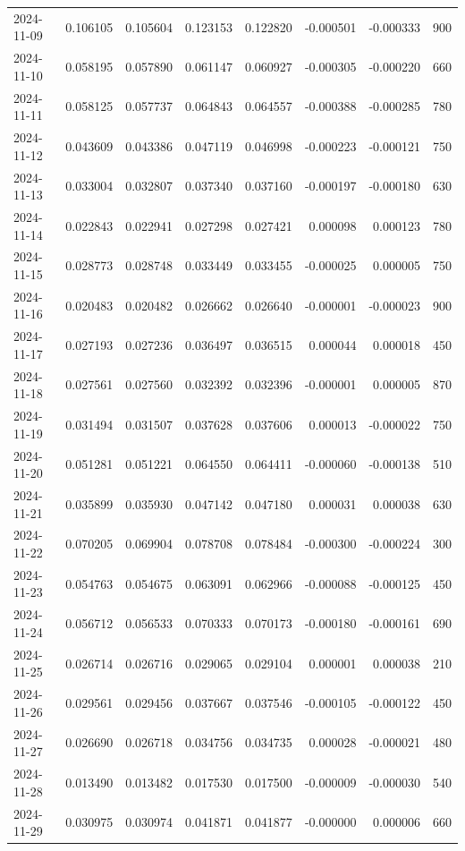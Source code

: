\begin{tabular}{lrrrrrrr}
2024-11-09 & 0.106105 & 0.105604 & 0.123153 & 0.122820 & -0.000501 & -0.000333 & 900 \\
2024-11-10 & 0.058195 & 0.057890 & 0.061147 & 0.060927 & -0.000305 & -0.000220 & 660 \\
2024-11-11 & 0.058125 & 0.057737 & 0.064843 & 0.064557 & -0.000388 & -0.000285 & 780 \\
2024-11-12 & 0.043609 & 0.043386 & 0.047119 & 0.046998 & -0.000223 & -0.000121 & 750 \\
2024-11-13 & 0.033004 & 0.032807 & 0.037340 & 0.037160 & -0.000197 & -0.000180 & 630 \\
2024-11-14 & 0.022843 & 0.022941 & 0.027298 & 0.027421 & 0.000098 & 0.000123 & 780 \\
2024-11-15 & 0.028773 & 0.028748 & 0.033449 & 0.033455 & -0.000025 & 0.000005 & 750 \\
2024-11-16 & 0.020483 & 0.020482 & 0.026662 & 0.026640 & -0.000001 & -0.000023 & 900 \\
2024-11-17 & 0.027193 & 0.027236 & 0.036497 & 0.036515 & 0.000044 & 0.000018 & 450 \\
2024-11-18 & 0.027561 & 0.027560 & 0.032392 & 0.032396 & -0.000001 & 0.000005 & 870 \\
2024-11-19 & 0.031494 & 0.031507 & 0.037628 & 0.037606 & 0.000013 & -0.000022 & 750 \\
2024-11-20 & 0.051281 & 0.051221 & 0.064550 & 0.064411 & -0.000060 & -0.000138 & 510 \\
2024-11-21 & 0.035899 & 0.035930 & 0.047142 & 0.047180 & 0.000031 & 0.000038 & 630 \\
2024-11-22 & 0.070205 & 0.069904 & 0.078708 & 0.078484 & -0.000300 & -0.000224 & 300 \\
2024-11-23 & 0.054763 & 0.054675 & 0.063091 & 0.062966 & -0.000088 & -0.000125 & 450 \\
2024-11-24 & 0.056712 & 0.056533 & 0.070333 & 0.070173 & -0.000180 & -0.000161 & 690 \\
2024-11-25 & 0.026714 & 0.026716 & 0.029065 & 0.029104 & 0.000001 & 0.000038 & 210 \\
2024-11-26 & 0.029561 & 0.029456 & 0.037667 & 0.037546 & -0.000105 & -0.000122 & 450 \\
2024-11-27 & 0.026690 & 0.026718 & 0.034756 & 0.034735 & 0.000028 & -0.000021 & 480 \\
2024-11-28 & 0.013490 & 0.013482 & 0.017530 & 0.017500 & -0.000009 & -0.000030 & 540 \\
2024-11-29 & 0.030975 & 0.030974 & 0.041871 & 0.041877 & -0.000000 & 0.000006 & 660 \\

\end{tabular}
